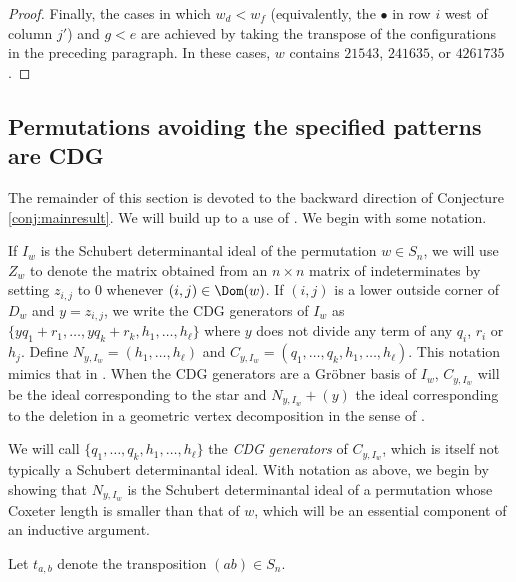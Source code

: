 \begin{proof}
Finally, the cases in which $w_d<w_f$ (equivalently, the $\bullet$ in row $i$ west of column $j'$) and $g<e$ are achieved by taking the transpose of the configurations in the preceding paragraph.  In these cases, $w$ contains $21543$, $241635$, or $4261735$.
\end{proof}

\subsection{Permutations avoiding the specified patterns are CDG} \label{subsect:backward} The remainder of this section is devoted to the backward direction of Conjecture \ref{conj:mainresult}.  We will build up to a use of \cite[Corollary 4.13]{KR}.  We begin with some notation.

If $I_w$ is the Schubert determinantal ideal of the permutation $w \in S_n$, we will use $Z_w$ to denote the matrix obtained from an $n \times n$ matrix of indeterminates by setting $z_{i,j}$ to $0$ whenever $(i,j) \in \Dom(w)$.   If $(i,j)$ is a lower outside corner of $D_w$ and $y = z_{i,j}$, we write the CDG generators of $I_w$ as $\{yq_1+r_1, \ldots, yq_k+r_k, h_1, \ldots, h_\ell\}$ where $y$ does not divide any term of any $q_i$, $r_i$ or $h_j$.  Define $N_{y,I_w} = (h_1, \ldots, h_\ell)$ and $C_{y,I_w} = (q_1, \ldots, q_k, h_1, \ldots, h_\ell)$.  This notation mimics that in \cite{KR}.  When the CDG generators are a Gr\"obner basis of $I_w$, $C_{y,I_w}$ will be the ideal corresponding to the star and $N_{y,I_w}+(y)$ the ideal corresponding to the deletion in a geometric vertex decomposition in the sense of \cite{KMY09}.

We will call $\{q_1, \ldots, q_k, h_1, \ldots, h_\ell\}$ the \emph{CDG generators} of $C_{y,I_w}$, which is itself not typically a Schubert determinantal ideal.  With notation as above, we begin by showing that $N_{y,I_w}$ is the Schubert determinantal ideal of a permutation whose Coxeter length is smaller than that of $w$, which will be an essential component of an inductive argument.

Let $t_{a,b}$ denote the transposition $(ab) \in S_n$.

